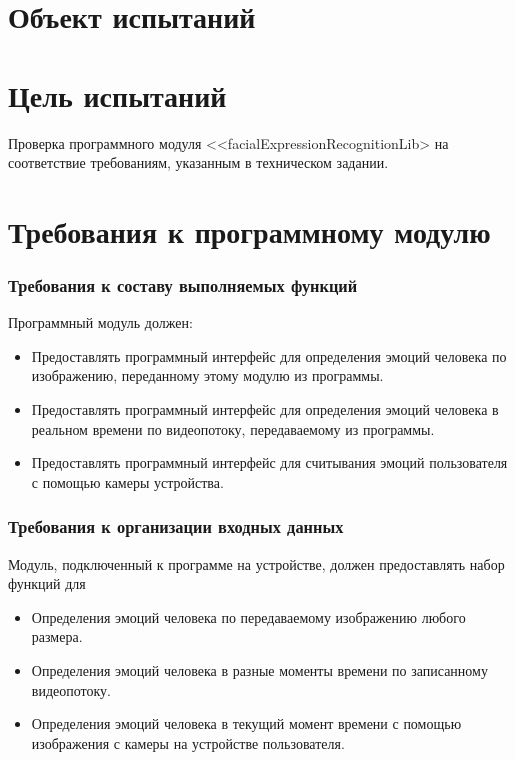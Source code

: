 \documentclass[a4paper,12pt]{article}
\begin{document}
    \newpage

    \thirdPage

    \newpage

    \section{Объект испытаний}

    \newpage

    \section{Цель испытаний}
    Проверка программного модуля <<facialExpressionRecognitionLib> на соответствие требованиям, указанным в техническом задании.
    \newpage

    \section{Требования к программному модулю}

    \subsubsection{Требования к составу выполняемых функций}
    Программный модуль должен:
    \begin{itemize}
        \item Предоставлять программный интерфейс для определения эмоций человека по изображению, переданному этому модулю из программы.
        \item Предоставлять программный интерфейс для определения эмоций человека в реальном времени по видеопотоку, передаваемому из программы.
        \item Предоставлять программный интерфейс для считывания эмоций пользователя с помощью камеры устройства.
    \end{itemize}
    \subsubsection{Требования к организации входных данных}
    Модуль, подключенный к программе на устройстве, должен предоставлять набор функций для
    \begin{itemize}
        \item Определения эмоций человека по передаваемому изображению любого размера.
        \item Определения эмоций человека в разные моменты времени по записанному видеопотоку.
        \item Определения эмоций человека в текущий момент времени с помощью изображения с камеры на устройстве пользователя.
    \end{itemize}
\end{document}
